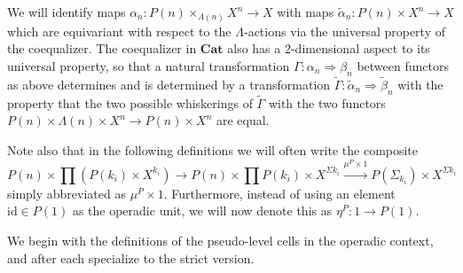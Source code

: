 \documentclass{amsbook} %
\newcommand{\mb}{\mathbf}
\numberwithin{section}{chapter}
\begin{document}
\begin{conv}\label{conv_coeq}
We will identify maps $\alpha_n \colon P(n) \times_{\Lambda(n)} X^n \rightarrow X$ with maps $\tilde{\alpha}_n \colon P(n) \times X^n \rightarrow X$ which are equivariant with respect to the $\Lambda$-actions via the universal property of the coequalizer.  The coequalizer in $\mb{Cat}$ also has a 2-dimensional aspect to its universal property, so that a natural transformation $\Gamma \colon \alpha_{n} \Rightarrow \beta_{n}$ between functors as above determines and is determined by a transformation $\tilde{\Gamma} \colon \tilde{\alpha}_{n} \Rightarrow \tilde{\beta}_{n}$ with the property that the two possible whiskerings of $\tilde{\Gamma}$ with the two functors $P(n) \times \Lambda(n) \times X^{n} \to P(n) \times X^{n}$ are equal.

Note also that in the following definitions we will often write the composite
    \[
        P(n) \times \prod(P(k_i) \times X^{k_i}) \rightarrow P(n) \times \prod P(k_i) \times X^{\Sigma k_i} \xrightarrow{\mu^P \times 1} P(\Sigma_{k_i}) \times X^{\Sigma k_i}
    \]
simply abbreviated as $\mu^P \times 1$.  Furthermore, instead of using an element $\textrm{id} \in P(1)$ as the operadic unit, we will now denote this as $\eta^{P}:1 \rightarrow P(1)$.
\end{conv}

We begin with the definitions of the pseudo-level cells in the operadic context, and after each specialize to the strict version.
\end{document}
